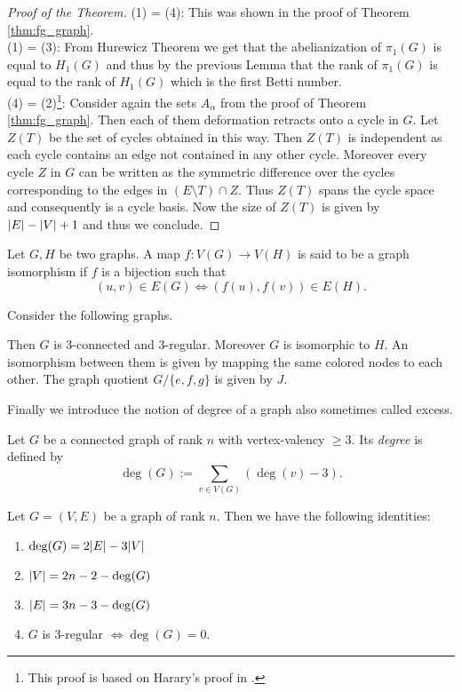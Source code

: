 \begin{proof}[Proof of the Theorem]
	(1) = (4): This was shown in the proof of Theorem \ref{thm:fg_graph}.\\
	(1) = (3): From Hurewicz Theorem we get that the abelianization of $\pi_{1}(G)$ is equal to $H_{1}(G)$
	and thus by the previous Lemma that the rank of $\pi_1(G)$ is equal to the rank of $H_1(G)$ which is the first Betti number.\\
	(4) = (2)\footnote{This proof is based on Harary's proof in \cite[p. 37-40]{harary69}.}:
		Consider again the sets $A_{\alpha}$ from the proof of Theorem \ref{thm:fg_graph}. Then each of them deformation retracts onto a cycle in $G$.
	Let $Z(T)$ be the set of cycles obtained in this way. Then  $Z(T)$ is independent as each cycle contains an edge not contained in any other cycle.
	Moreover every cycle $Z$ in $G$ can be written as the symmetric difference over the cycles corresponding to the edges in $(E \setminus T) \cap Z$.
	Thus $Z(T)$ spans the cycle space and consequently is a cycle basis. Now the size of $Z(T)$ is given by $\abs{E} - \abs{V} + 1$ and thus we conclude.
\end{proof}

\begin{definition}
	Let $G,H$ be two graphs. A map $f: V(G) \to V(H)$ is said to be a graph isomorphism if $f$ is a bijection such that
	\[
		(u,v) \in E(G) \Leftrightarrow (f(u),f(v)) \in E(H)
	.\] 
\end{definition}

\begin{eg}\label{ex:gAuto}
	Consider the following graphs.

	Then $G$ is $3$-connected and $3$-regular. Moreover $G$ is isomorphic to $H$.
	An isomorphism between them is given by mapping the same colored nodes to each other.
	The graph quotient $G / \{e,f,g\}$ is given by $J$.
\end{eg}

Finally we introduce the notion of degree of a graph also sometimes called excess.
\begin{definition}
	Let $G$ be a connected graph of rank $n$ with vertex-valency $\geq 3$. Its \emph{degree} is defined by
	\[
		\deg(G) := \sum_{v \in V(G)} (\deg(v) - 3)
	.\] 
\end{definition}

\begin{proposition}
	Let $G = (V,E)$ be a graph of rank $n$. Then we have the following identities:
	\begin{enumerate}
		\item $\deg(G) = 2 \abs{E} - 3 \abs{V}$
		\item $\abs{V} = 2n -2 - \deg(G)$
		\item $\abs{E} = 3n - 3 - \deg(G)$
		\item $G$ is $3$-regular $\Leftrightarrow \deg(G) = 0$.
	\end{enumerate}	
\end{proposition}


